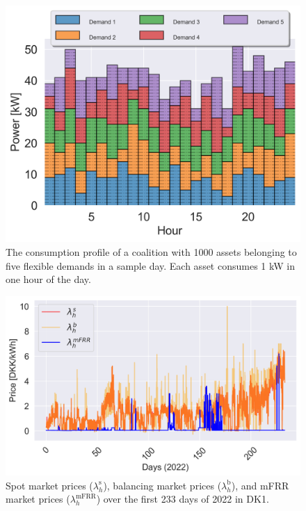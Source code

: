 \documentclass[conference]{IEEEtran}
\begin{document}

\begin{figure}[!t]
    \centering
    \includegraphics[width=\columnwidth]{figures/assets2.png}
    \caption{The consumption profile of a coalition with 1000 assets belonging to five flexible demands in a sample day. Each asset consumes 1 kW in one hour of the day.}
    \label{fig:assets}
\end{figure}

\begin{figure}[t]
    \centering
    \includegraphics[width=\columnwidth]{figures/prices.png}
    \caption{Spot market prices ($\lambda^{\text{s}}_h$), balancing market prices ($\lambda^{\text{b}}_h$), and mFRR market prices ($\lambda^{\text{mFRR}}_h$)  over the first 233 days of 2022 in DK1.}
    \label{fig:prices}
\end{figure}
\end{document}
